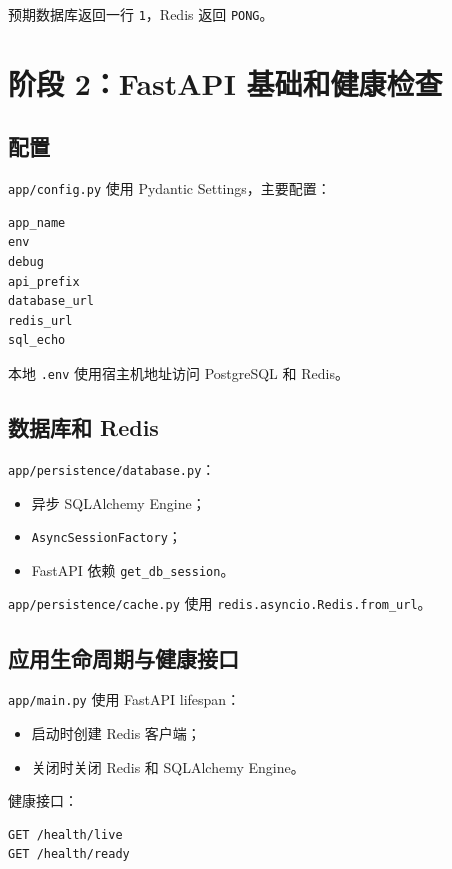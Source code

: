 \documentclass[11pt,a4paper]{ctexart}
\begin{document}
预期数据库返回一行 \texttt{1}，Redis 返回 \texttt{PONG}。

\section{阶段 2：FastAPI 基础和健康检查}

\subsection{配置}

\texttt{app/config.py} 使用 Pydantic Settings，主要配置：

\begin{lstlisting}
app_name
env
debug
api_prefix
database_url
redis_url
sql_echo
\end{lstlisting}

本地 \texttt{.env} 使用宿主机地址访问 PostgreSQL 和 Redis。

\subsection{数据库和 Redis}

\texttt{app/persistence/database.py}：

\begin{itemize}[leftmargin=2em]
  \item 异步 SQLAlchemy Engine；
  \item \texttt{AsyncSessionFactory}；
  \item FastAPI 依赖 \texttt{get\_db\_session}。
\end{itemize}

\texttt{app/persistence/cache.py} 使用 \texttt{redis.asyncio.Redis.from\_url}。

\subsection{应用生命周期与健康接口}

\texttt{app/main.py} 使用 FastAPI lifespan：

\begin{itemize}[leftmargin=2em]
  \item 启动时创建 Redis 客户端；
  \item 关闭时关闭 Redis 和 SQLAlchemy Engine。
\end{itemize}

健康接口：

\begin{lstlisting}
GET /health/live
GET /health/ready
\end{lstlisting}
\end{document}
